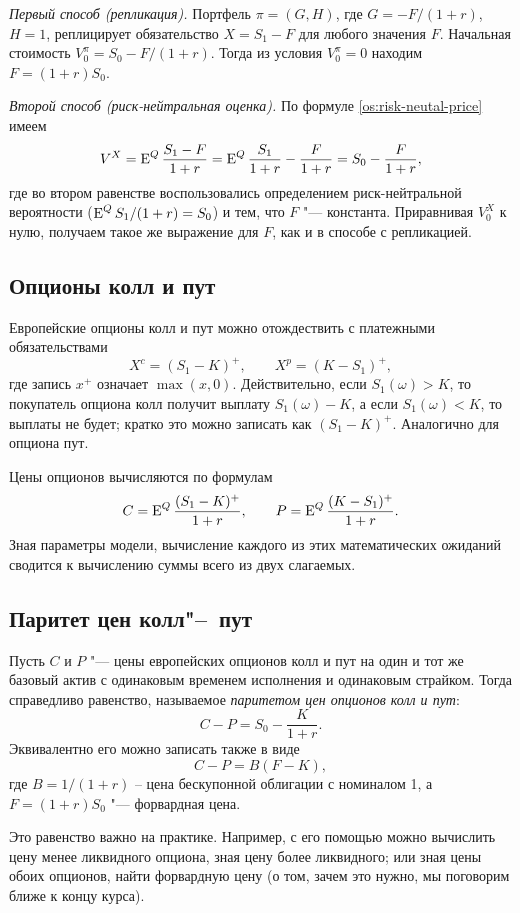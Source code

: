 \textit{Первый способ (репликация).} Портфель $\pi=(G,H)$, где $G = -F/(1+r)$, $H=1$, реплицирует обязательство $X=S_1 - F$ для любого значения $F$. Начальная стоимость $V_0^\pi = S_0 - F/(1+r)$.
Тогда из условия $V^\pi_0 = 0$ находим $F=(1+r)S_0$.

\textit{Второй способ (риск-нейтральная оценка).} По формуле \eqref{os:risk-neutal-price} имеем
\[
V^X = \operatorname{E}^Q \frac{S_1 - F}{1+r} = \operatorname{E}^Q\frac{S_1}{1+r} - \frac{F}{1+r} = S_0 - \frac{F}{1+r},
\]
где во втором равенстве воспользовались определением риск-нейтральной вероятности ($\operatorname{E}^Q S_1/(1+r) = S_0$) и тем, что $F$ "--- константа.
Приравнивая $V^X_0$ к нулю, получаем такое же выражение для $F$, как и в способе с репликацией.

\subsection{Опционы колл и пут}
Европейские опционы колл и пут можно отождествить с платежными обязательствами
\[
X^c = (S_1 - K)^+, \qquad X^p = (K - S_1)^+,
\]
где запись $x^+$ означает $\max(x,0)$.
Действительно, если $S_1(\omega) > K$, то покупатель опциона колл получит выплату $S_1(\omega) - K$, а если $S_1(\omega) < K$, то выплаты не будет; кратко это можно записать как $(S_1 - K)^+$.
Аналогично для опциона пут.

Цены опционов вычисляются по формулам
\[
C =  \operatorname{E}^Q \frac{(S_1 - K)^+}{1+r}, \qquad
P = \operatorname{E}^Q \frac{(K - S_1)^+}{1+r}.
\]
Зная параметры модели, вычисление каждого из этих математических ожиданий сводится к вычислению суммы всего из двух слагаемых.

\subsection{Паритет цен колл"--~пут}
Пусть $C$ и $P$ "--- цены европейских опционов колл и пут на один и тот же базовый актив с одинаковым временем исполнения и одинаковым страйком.
Тогда справедливо равенство, называемое \emph{паритетом цен опционов колл и пут}:
\[
C - P = S_0 - \frac{K}{1+r}.
\]
Эквивалентно его можно записать также в виде
\[
C - P = B(F - K),
\]
где $B=1/(1+r)$ -- цена бескупонной облигации с номиналом 1, а $F=(1+r)S_0$ "--- форвардная цена.

Это равенство важно на практике. Например, с его помощью можно вычислить цену менее ликвидного опциона, зная цену более ликвидного; или зная цены обоих опционов, найти форвардную цену (о том, зачем это нужно, мы поговорим ближе к концу курса).

